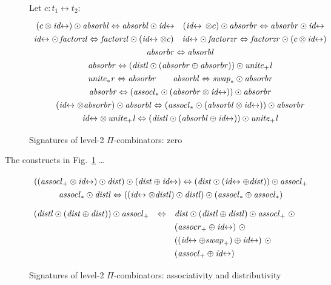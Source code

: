 \documentclass{article}
\newcommand{\identlp}{\mathit{unite}_+\mathit{l}}
\newcommand{\swapp}{\mathit{swap}_+}
\newcommand{\assoclp}{\mathit{assocl}_+}
\newcommand{\assocrp}{\mathit{assocr}_+}
\newcommand{\identlst}{\mathit{unite}_*\mathit{r}}
\newcommand{\swapt}{\mathit{swap}_*}
\newcommand{\assoclt}{\mathit{assocl}_*}
\newcommand{\absorbr}{\mathit{absorbr}}
\newcommand{\absorbl}{\mathit{absorbl}}
\newcommand{\factorzr}{\mathit{factorzr}}
\newcommand{\factorzl}{\mathit{factorzl}}
\newcommand{\dist}{\mathit{dist}}
\newcommand{\distl}{\mathit{distl}}
\newcommand{\idc}{\mathit{id}\!\!\leftrightarrow}
\begin{document}
\begin{figure}[tb]
Let $c : t_1 \leftrightarrow t_2$:
\[\def\arraystretch{1.3}
\begin{array}{c}
  {(c \otimes \idc) \odot \absorbl \Leftrightarrow \absorbl \odot \idc}
\quad
  {(\idc \, \otimes c) \odot \absorbr \Leftrightarrow \absorbr \odot \idc}
\\
  {\idc \odot \, \factorzl \Leftrightarrow \factorzl \odot (\idc \otimes c)}
\quad
  {\idc \odot \, \factorzr \Leftrightarrow \factorzr \odot (c \otimes \idc)}
\\
  {\absorbr \Leftrightarrow \absorbl}
\\
  {\absorbr \Leftrightarrow (\distl \odot (\absorbr \oplus \absorbr)) \odot \identlp}
\\
  {\identlst \Leftrightarrow \absorbr}
\qquad
  {\absorbl \Leftrightarrow \swapt \odot \absorbr}
\\
  {\absorbr \Leftrightarrow (\assoclt \odot (\absorbr \otimes \idc)) \odot \absorbr}
\\
  {(\idc \otimes \absorbr) \odot \absorbl \Leftrightarrow (\assoclt \odot (\absorbl \otimes \idc)) \odot \absorbr}
\\
  {\idc \otimes \, \identlp \Leftrightarrow (\distl \odot (\absorbl \oplus \idc)) \odot \identlp}
\end{array}\]
\caption{\label{figc}Signatures of level-2 $\Pi$-combinators: zero}
\end{figure}

The constructs in Fig.~\ref{figc} \ldots
\begin{center}
\begin{tikzpicture}[scale=0.7,every node/.style={scale=0.8}]
\end{tikzpicture}
\end{center}

\begin{figure}[tb]
\[\def\arraystretch{1.3}
\begin{array}{c}
  {((\assoclp \otimes \idc) \odot \dist) \odot (\dist \oplus \idc) \Leftrightarrow (\dist \odot (\idc \oplus \dist)) \odot \assoclp}
\\
  {\assoclt \odot \distl \Leftrightarrow ((\idc \otimes \distl) \odot \distl) \odot (\assoclt \oplus \assoclt)}
\end{array}\]
\vspace{ -0.5em}
\[\def\arraystretch{1.3}
\begin{array}{rcl}
  (\distl \odot (\dist \oplus \dist)) \odot \assoclp &\Leftrightarrow&
   \dist \odot (\distl \oplus \distl) \odot \assoclp ~\odot \\
&& (\assocrp \oplus \idc) ~\odot \\
&& ((\idc \oplus \swapp) \oplus \idc) ~\odot \\
&&      (\assoclp \oplus \idc)
\end{array}\]
\caption{\label{figb}Signatures of level-2 $\Pi$-combinators: associativity and distributivity}
\end{figure}
\end{document}
